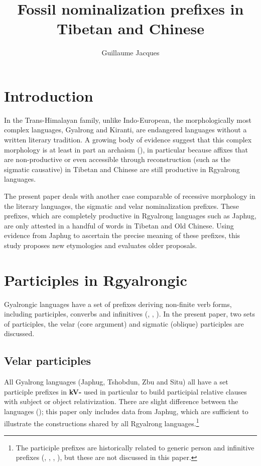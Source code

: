 \documentclass[oneside,a4paper,11pt]{article}
\newcommand{\ipa}[1]{\textbf{{\phon\mbox{#1}}}} %
\begin{document}
\title{Fossil nominalization prefixes in Tibetan and Chinese}
\author{Guillaume Jacques}
\maketitle

\section{Introduction}
  In the Trans-Himalayan family, unlike Indo-European, the morphologically most complex languages, Gyalrong and Kiranti, are endangered languages without a written literary tradition. A growing body of evidence suggest that this complex morphology is at least in part an archaism (\citealt{jacques12agreement, delancey14second, jacques16ssuffixes, gong17xingtaixue}), in particular because affixes that are non-productive or even accessible through reconstruction (such as the sigmatic causative) in Tibetan and Chinese are still productive in Rgyalrong languages.

The present paper deals with another case comparable of recessive morphology in the literary languages, the sigmatic and velar nominalization prefixes. These prefixes, which are completely productive in Rgyalrong languages such as Japhug, are only attested in a handful of words in Tibetan and Old Chinese. Using evidence from Japhug to ascertain the precise meaning of these prefixes, this study proposes new etymologies and evaluates older proposals.

\section{Participles in Rgyalrongic}
Gyalrongic languages have a set of prefixes deriving non-finite verb forms, including participles, converbs and infinitives (\citealt{jacques14linking}, \citealt{jackson14morpho}, \citealt{jacques16relatives}). In the present paper, two sets of participles, the velar (core argument) and sigmatic (oblique) participles are discussed.


\subsection{Velar participles} \label{sec:rgyalrong.velar}
All Gyalrong languages (Japhug, Tshobdun, Zbu and Situ) all have a set participle prefixes in \ipa{kV-} used in particular to build participial relative clauses with subject or object relativization. There are slight difference between the languages (\citealt{jackson06guanxiju, jacksonlin07, jacques16relatives, zhang16bragdbar}); this paper only includes data from Japhug, which are sufficient to illustrate the constructions shared by all Rgyalrong languages.\footnote{The participle prefixes are historically related to generic person and infinitive prefixes (\citealt{sun12complementation}, \citealt{sun14generic}, \citealt{jacques16complementation}, \citealt{jacques18generic}), but these are not discussed in this paper. }
\end{document}
